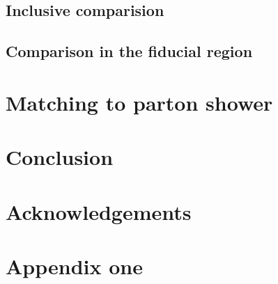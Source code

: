 \documentclass[twocolumn,epjc3]{svjour3} %
\begin{document}
\subsection{Inclusive comparision}



\subsection{Comparison in the fiducial region}






\section{Matching to parton shower}
\label{sec:matching}



\section{Conclusion}
\label{sec:conclusion}




\section*{Acknowledgements}



\appendix

\section{Appendix one}




\end{document}
